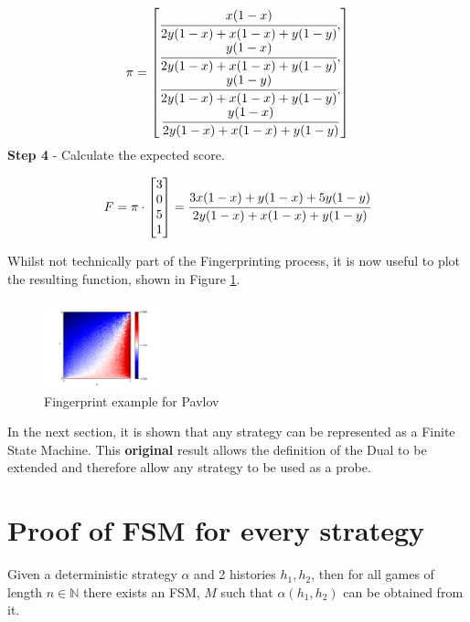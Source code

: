 \begin{equation}\label{eq:steady_state}
%
\pi =
\begin{bmatrix}
\cfrac{x (1 - x)}{2y(1-x) + x(1-x) + y(1-y)}, \\
\cfrac{y (1 - x)}{2y(1-x) + x(1-x) + y(1-y)}, \\
\cfrac{y (1 - y)}{2y(1-x) + x(1-x) + y(1-y)}, \\
\cfrac{y (1 - x)}{2y(1-x) + x(1-x) + y(1-y)}
\end{bmatrix}
\end{equation}
\textbf{Step 4} - Calculate the expected score.

\begin{equation}
F = \pi \cdot
\begin{bmatrix}
3 \\
0 \\
5 \\
1
\end{bmatrix}
=
\cfrac{3x(1-x) + y(1-x) + 5y(1-y)}{2y(1-x) + x(1-x) + y(1-y)}
\end{equation}

Whilst not technically part of the Fingerprinting process, it is now useful to plot the resulting function, shown in Figure \ref{fig:pavlov_fing_ex}.

\begin{figure}[htbp!]
\centering
\includegraphics[width = 0.3\textwidth]{../img/Numerical/Win_Stay_Lose_Shift.png}
\caption{Fingerprint example for Pavlov}
\label{fig:pavlov_fing_ex}
\end{figure}

In the next section, it is shown that any strategy can be represented as a Finite State Machine.
This \textbf{original} result allows the definition of the Dual to be extended and therefore allow any strategy to be used as a probe.



\section{Proof of FSM for every strategy}\label{sec:fsm_proof}
\begin{theorem}\label{thm:fsm}
Given a deterministic strategy $\alpha$ and 2 histories $h_1, h_2$, then for all games of length $n \in \mathbb{N}$ there exists an FSM, $M$ such that $\alpha(h_1, h_2)$ can be obtained from it.
\end{theorem}


